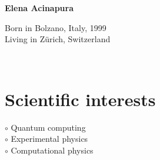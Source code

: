 \documentclass[a4paper,10pt]{article}
\begin{document}
\begin{adjustbox}{valign=t}
\begin{minipage}{0.3\textwidth} %
\begin{center}

\MySkip 	%

{\LARGE \bfseries Elena Acinapura}

\MySkip 	%

Born in Bolzano, Italy, 1999\\
Living in Zürich, Switzerland\\

\MySkip 	%

\textcolor{ColorTwo}{\faEnvelopeO} 
 \\

\textcolor{ColorTwo}{\faChain} 
\end{center}

\vfill

\section*{Scientific interests}
\raggedright
\textcolor{ColorOne}{$\circ$} Quantum computing\\
\textcolor{ColorOne}{$\circ$} Experimental physics\\
\textcolor{ColorOne}{$\circ$} Computational physics\\


\end{minipage}
\end{adjustbox}
\end{document}
